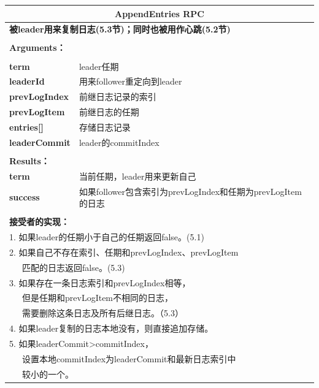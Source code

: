 \documentclass[journal]{IEEEtran}
\begin{document}
\begin{table}[htp]
\begin{center}
\begin{tabular}{|p{2cm}p{6cm}|}
\hline
\multicolumn{2}{|c|}{\textbf{AppendEntries RPC}}  \\
\hline
\multicolumn{2}{|l|}{\textbf{被leader用来复制日志(5.3节)；同时也被用作心跳(5.2节)}} \\
&\\
\multicolumn{2}{|l|}{\textbf{Arguments：}} \\
&\\
\textbf{term} & leader任期\\
\textbf{leaderId} & 用来follower重定向到leader\\
\textbf{prevLogIndex} & 前继日志记录的索引 \\ 
\textbf{prevLogItem} & 前继日志的任期 \\
\textbf{entries[]} & 存储日志记录\\
\textbf{leaderCommit} & leader的commitIndex\\
&\\
\multicolumn{2}{|l|}{\textbf{Results：}} \\
\textbf{term} & 当前任期，leader用来更新自己\\
\textbf{success} & 如果follower包含索引为prevLogIndex和任期为prevLogItem的日志\\
&\\
\multicolumn{2}{|l|}{\textbf{接受者的实现：}} \\
\multicolumn{2}{|l|}{1. 如果leader的任期小于自己的任期返回false。(5.1)} \\
\multicolumn{2}{|l|}{2. 如果自己不存在索引、任期和prevLogIndex、prevLogItem} \\
\multicolumn{2}{|l|}{\ \ \ 匹配的日志返回false。(5.3)}\\
\multicolumn{2}{|l|}{3. 如果存在一条日志索引和prevLogIndex相等，}\\
\multicolumn{2}{|l|}{\ \ \ 但是任期和prevLogItem不相同的日志，}\\
\multicolumn{2}{|l|}{\ \ \ 需要删除这条日志及所有后继日志。（5.3）}\\
\multicolumn{2}{|l|}{4. 如果leader复制的日志本地没有，则直接追加存储。}\\
\multicolumn{2}{|l|}{5. 如果leaderCommit>commitIndex，}\\
\multicolumn{2}{|l|}{\ \ \ 设置本地commitIndex为leaderCommit和最新日志索引中}\\
\multicolumn{2}{|l|}{\ \ \ 较小的一个。}\\
\hline
\end{tabular}
\end{center}
\label{default}
\end{table}%
\end{document}
